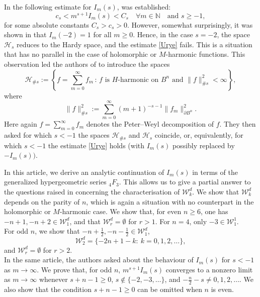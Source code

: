 \documentclass{article}
\theoremstyle{boldremark}
\renewcommand\[{\begin{equation}}
\renewcommand\]{\end{equation}}
\theoremstyle{definition}
\numberwithin{equation}{section}
\begin{document}
In \cite{Ureyen2023} the following estimate for $I_m(s)$, was established:
\begin{equation}\label{Urye}
    c_s < m^{s+1} I_m(s) < C_s \quad \forall m \in \mathbb{N} \quad \text{and $s \geq -1$},
\end{equation}
for some absolute constants $C_s > c_s > 0.$ 
However, somewhat surprisingly, it was shown in \cite{BEY2025} that
$I_m(-2)=1$ for all $m\geq0$. Hence, in the case $s=-2$,
the space $\mathcal{H}_s$ reduces to the Hardy space, and the estimate
\eqref{Urye} fails. This is a situation that has no parallel in the case of holomorphic or $M$-harmonic functions. 
This observation led the authors of \cite{BEY2025} to introduce the spaces
\begin{equation}\label{definiceH}
\mathcal{H}_{\#s}
:=
\left\{
f = \sum_{m=0}^{\infty} f_m
\,:\,
f \text{ is } H\text{-harmonic on } B^n
\text{ and }
\|f\|_{\#s}^{2} < \infty
\right\},
\end{equation}
where
$$
\|f\|_{\#s}^{2}
:=
\sum_{m=0}^{\infty}
(m+1)^{-s-1}
\|f_m\|_{\partial B^n}^{2}.
$$
Here again \(f=\sum_{m=0}^{\infty} f_m\) denotes the Peter--Weyl decomposition of \(f\).
They then asked for which $s<-1$ the spaces $\mathcal{H}_{\#s}$ and
$\mathcal{H}_s$ coincide, or, equivalently, for which $s < -1$ the estimate \eqref{Urye} holds (with $I_m(s)$ possibly replaced by $-I_m(s)).$


In this article, we derive an analytic continuation of $I_m(s)$ in terms
of the generalized hypergeometric series ${}_4F_3$.
This allows us to give a partial answer to the questions raised in \cite{BEY2025} concerning the
characterisation of $\mathcal{W}_k^d$. 
We show that $\mathcal{W}_k^d$
depends on the parity of $n$, which is again a situation with no
counterpart in the holomorphic or $M$-harmonic case.
We show that, for even $n \geq 6$, one has
$-n+1,-n+2 \in \mathcal{W}_1^d$, and that
$\mathcal{W}_r^d=\emptyset$ for $r>1$. For $n=4$, only $-3 \in \mathcal{W}_1^1.$\\
For odd $n$, we show that
$-n+\frac{1}{2},-n-\frac{1}{2}\in \mathcal{W}_1^d$,
$$
\mathcal{W}_2^d=\{-2n+1-k:\ k = 0,1,2,\dots\},
$$
and $\mathcal{W}_r^d=\emptyset$ for $r>2$.\\
In the same article, the authors asked about the behaviour of $I_m(s)$
for $s<-1$ as $m\to\infty$. We prove that, for odd $n$,
$m^{s+1}I_m(s)$ converges to a nonzero limit as $m\to\infty$ whenever
$s+n-1\geq0$, $s\notin\{-2,-3,\ldots\}$, and
$-\frac n2-s\neq 0,1,2,\dots$. We also show that the condition
$s+n-1\geq0$ can be omitted when $n$ is even.
\end{document}
